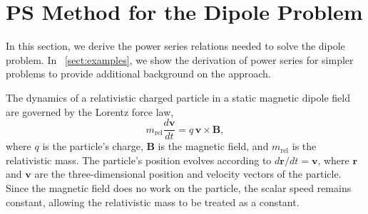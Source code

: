 \documentclass[draft]{agujournal2019}
\begin{document}
\section{PS Method for the Dipole Problem}\label{sec:dipole}

In this section, we derive the power series relations needed to solve the dipole problem. In ~\ref{sect:examples}, we show the derivation of power series for simpler problems to provide additional background on the approach.

The dynamics of a relativistic charged particle in a static magnetic dipole field are governed by the Lorentz force law,
        \begin{equation*}
           m_{\text{rel}}\frac{d\mathbf{v}}{dt}=q\,\mathbf{v}\times\mathbf{B},
        \end{equation*}
where $q$ is the particle's charge, $\mathbf{B}$ is the magnetic field, and $m_{\text{rel}}$ is the relativistic mass. The particle's position evolves according to $d\mathbf{r}/dt=\mathbf{v}$, where $\mathbf{r}$ and $\mathbf{v}$ are the three-dimensional position and velocity vectors of the particle. Since the magnetic field does no work on the particle, the scalar speed remains constant, allowing the relativistic mass to be treated as a constant.
\end{document}
